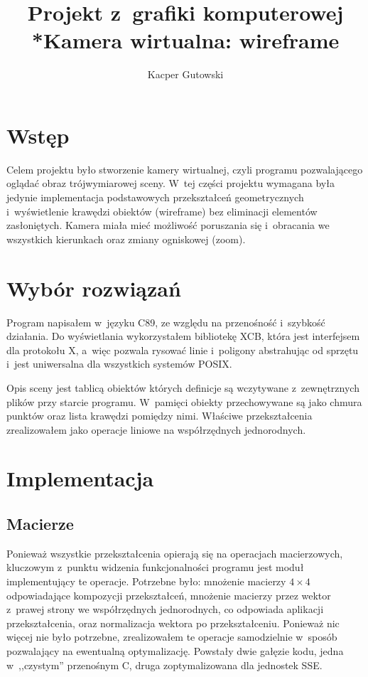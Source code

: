 \documentclass[12pt,a4paper]{article}
\author{Kacper Gutowski}
\title{Projekt z~grafiki komputerowej\\*Kamera wirtualna: wire\dywiz frame}
\begin{document}
%
\maketitle

\section{Wstęp}

Celem projektu było stworzenie kamery wirtualnej, czyli programu pozwalającego
oglądać obraz trójwymiarowej sceny. W~tej części projektu wymagana była jedynie
implementacja podstawowych przekształceń geometrycznych i~wyświetlenie
krawędzi obiektów (wire\dywiz frame) bez eliminacji elementów zasłoniętych.
Kamera miała mieć możliwość poruszania się i~obracania we wszystkich kierunkach
oraz zmiany ogniskowej (zoom).

\section{Wybór rozwiązań}

Program napisałem w~języku C89, ze względu na przenośność i~szybkość działania.
Do wyświetlania wykorzystałem bibliotekę XCB, która jest interfejsem dla protokołu X,
a~więc pozwala rysować linie i~poligony abstrahując od sprzętu i~jest uniwersalna
dla wszystkich systemów POSIX.

Opis sceny jest tablicą obiektów których definicje są wczytywane
z~zewnętrznych plików przy starcie programu.
W~pamięci obiekty przechowywane są jako chmura punktów oraz lista krawędzi pomiędzy nimi.
Właściwe przekształcenia zrealizowałem jako operacje liniowe na współrzędnych jednorodnych.

\section{Implementacja}

\subsection{Macierze}
Ponieważ wszystkie przekształcenia opierają się na operacjach macierzowych,
kluczowym z~punktu widzenia funkcjonalności programu jest moduł implementujący te operacje.
Potrzebne było: mnożenie macierzy $4\times4$ odpowiadające kompozycji przekształceń,
mnożenie macierzy przez wektor z~prawej strony we współrzędnych jednorodnych,
co odpowiada aplikacji przekształcenia, oraz normalizacja wektora po przekształceniu.
Ponieważ nic więcej nie było potrzebne, zrealizowałem te operacje samodzielnie
w~sposób pozwalający na ewentualną optymalizację.  Powstały dwie gałęzie kodu,
jedna w~,,czystym'' przenośnym C, druga zoptymalizowana dla jednostek SSE.
\end{document}

